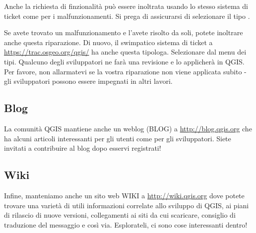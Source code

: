Anche la richiesta di finzionalità può essere inoltrata usando lo stesso sistema di ticket come per i malfunzionamenti. Si prega di assicurarsi di selezionare il tipo .

Se avete trovato un malfunzionamento e l'avete risolto da soli, potete inoltrare anche questa riparazione. Di nuovo, il swimpatico sistema di ticket a \url{https://trac.osgeo.org/qgis/} ha anche questa tipologa. Selezionare  dal menu dei tipi. Qualcuno degli sviluppatori ne farà una revisione e lo applicherà in QGIS. \\
Per favore, non allarmatevi se la vostra riparazione non viene applicata subito - gli sviluppatori possono essere impegnati in altri lavori.

\subsection{Blog}
La comunità QGIS mantiene anche un weblog (BLOG) a \url{http://blog.qgis.org} che ha alcuni articoli interessanti per gli utenti come per gli sviluppatori. Siete invitati a contribuire al blog dopo esservi registrati!

\subsection{Wiki}
Infine, manteniamo anche un sito web WIKI a \url{http://wiki.qgis.org} dove potete trovare una varietà di utili informazioni correlate allo sviluppo di QGIS, ai piani di rilascio di nuove versioni, collegamenti ai siti da cui scaricare, consiglio di traduzione del messaggio e così via. Esplorateli, ci sono cose interessanti dentro!

